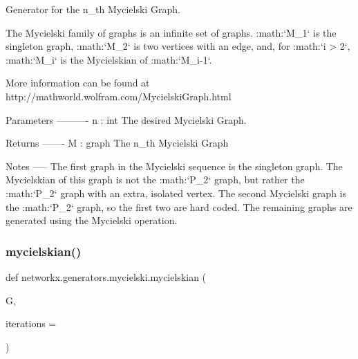 \begin{DoxyVerb}Generator for the n_th Mycielski Graph.

The Mycielski family of graphs is an infinite set of graphs.
:math:`M_1` is the singleton graph, :math:`M_2` is two vertices with an
edge, and, for :math:`i > 2`, :math:`M_i` is the Mycielskian of
:math:`M_{i-1}`.

More information can be found at
http://mathworld.wolfram.com/MycielskiGraph.html

Parameters
----------
n : int
    The desired Mycielski Graph.

Returns
-------
M : graph
    The n_th Mycielski Graph

Notes
-----
The first graph in the Mycielski sequence is the singleton graph.
The Mycielskian of this graph is not the :math:`P_2` graph, but rather the
:math:`P_2` graph with an extra, isolated vertex. The second Mycielski
graph is the :math:`P_2` graph, so the first two are hard coded.
The remaining graphs are generated using the Mycielski operation.\end{DoxyVerb}
 \mbox{\label{namespacenetworkx_1_1generators_1_1mycielski_ade7783c9254474cee45d70c1dbc56a48}} 
\subsubsection{\texorpdfstring{mycielskian()}{mycielskian()}}
{\footnotesize\ttfamily def networkx.\+generators.\+mycielski.\+mycielskian (\begin{DoxyParamCaption}\item[{}]{G,  }\item[{}]{iterations = {} }\end{DoxyParamCaption})}


